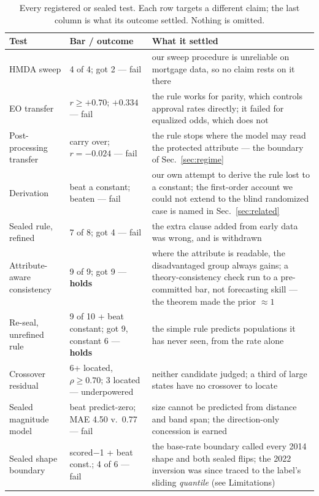 \documentclass[conference]{IEEEtran}
\begin{document}
\begin{table}[t]
\caption{Every registered or sealed test. Each row targets a different claim; the last
column is what its outcome settled. Nothing is omitted.}
\label{tab:registered}
\centering
\scriptsize
\setlength{\tabcolsep}{3pt}
\begin{tabular}{@{}p{2.35cm}p{1.55cm}p{3.6cm}@{}}
\toprule
\textbf{Test} & \textbf{Bar / outcome} & \textbf{What it settled} \\
\midrule
HMDA sweep & 4 of 4; got 2 --- fail & our sweep procedure is unreliable on mortgage data,
so no claim rests on it there \\
EO transfer & $r \geq +0.70$; $+0.334$ --- fail & the rule works for parity, which controls
approval rates directly; it failed for equalized odds, which does not \\
Post-processing transfer & carry over; $r = -0.024$ --- fail & the rule stops where the
model may read the protected attribute --- the boundary of Sec.~\ref{sec:regime} \\
Derivation & beat a constant; beaten --- fail & our own attempt to derive the rule lost
to a constant; the first-order account we could not extend to the blind randomized case is
named in Sec.~\ref{sec:related} \\
Sealed rule, refined & 7 of 8; got 4 --- fail & the extra clause added from early data was
wrong, and is withdrawn \\
Attribute-aware consistency & 9 of 9; got 9 --- \textbf{holds} & where the attribute is
readable, the disadvantaged group always gains; a theory-consistency check run to a
pre-committed bar, not forecasting skill --- the theorem made the prior $\approx 1$ \\
Re-seal, unrefined rule & 9 of 10 + beat constant; got 9, constant 6 --- \textbf{holds} &
the simple rule predicts populations it has never seen, from the rate alone \\
Crossover residual & 6+ located, $\rho \geq 0.70$; 3 located --- underpowered & neither
candidate judged; a third of large states have no crossover to locate \\
Sealed magnitude model & beat predict-zero; MAE 4.50 v.\ 0.77 --- fail & size cannot be
predicted from distance and band span; the direction-only concession is earned \\
Sealed shape boundary & scored$-$1 + beat const.; 4 of 6 --- fail & the base-rate boundary
called every 2014 shape and both sealed flips; the 2022 inversion was since traced to
the label's sliding \emph{quantile} (see Limitations) \\

\end{tabular}
\end{table}
\end{document}
